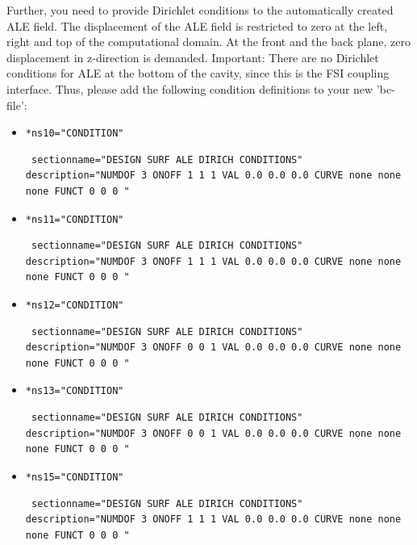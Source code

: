 Further, you need to provide Dirichlet conditions to the automatically created ALE field. The displacement of the
ALE field is restricted to zero at the left, right and top of the computational domain. At the front and the back plane,
zero displacement in z-direction is demanded. Important: There are no Dirichlet conditions for ALE
at the bottom of the cavity, since this is the FSI coupling interface. Thus, please add the following condition definitions to your new 'bc-file':

\begin{itemize}
 \item \verb|*ns10="CONDITION"|
\begin{small} \begin{verbatim} sectionname="DESIGN SURF ALE DIRICH CONDITIONS"
description="NUMDOF 3 ONOFF 1 1 1 VAL 0.0 0.0 0.0 CURVE none none none FUNCT 0 0 0 "
\end{verbatim} \end{small}

 \item \verb|*ns11="CONDITION"|
\begin{small} \begin{verbatim} sectionname="DESIGN SURF ALE DIRICH CONDITIONS"
description="NUMDOF 3 ONOFF 1 1 1 VAL 0.0 0.0 0.0 CURVE none none none FUNCT 0 0 0 "
\end{verbatim} \end{small}

 \item \verb|*ns12="CONDITION"|
\begin{small} \begin{verbatim} sectionname="DESIGN SURF ALE DIRICH CONDITIONS"
description="NUMDOF 3 ONOFF 0 0 1 VAL 0.0 0.0 0.0 CURVE none none none FUNCT 0 0 0 "
\end{verbatim} \end{small}

 \item \verb|*ns13="CONDITION"|
\begin{small} \begin{verbatim} sectionname="DESIGN SURF ALE DIRICH CONDITIONS"
description="NUMDOF 3 ONOFF 0 0 1 VAL 0.0 0.0 0.0 CURVE none none none FUNCT 0 0 0 "
\end{verbatim} \end{small}

 \item \verb|*ns15="CONDITION"|
\begin{small} \begin{verbatim} sectionname="DESIGN SURF ALE DIRICH CONDITIONS"
description="NUMDOF 3 ONOFF 1 1 1 VAL 0.0 0.0 0.0 CURVE none none none FUNCT 0 0 0 "
\end{verbatim} \end{small}


\end{itemize}
